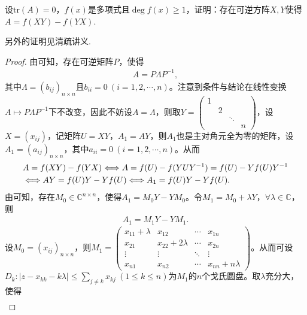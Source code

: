 \documentclass[../../main.tex]{subfiles}%
\begin{document}
\begin{proposition}
设$\mathrm{tr}(A)=0$，$f(x)$是多项式且$\deg f(x)\geqslant  1$，证明：存在可逆方阵$X,Y$使得$A = f(XY)-f(YX)$.
\end{proposition}
\begin{note}
另外的证明见清疏讲义.
\end{note}
\begin{proof}
由可知，存在可逆矩阵$P$，使得
\begin{align*}
A = P\Lambda P^{-1},
\end{align*}
其中$\Lambda = (b_{ij})_{n\times n}$且$b_{ii} = 0\ (i = 1,2,\cdots,n)$。注意到条件与结论在线性变换$A \mapsto P\Lambda P^{-1}$下不改变，因此不妨设$A = \Lambda$，则取$Y = \begin{pmatrix}
1 & & & \\
& 2 & & \\
& & \ddots & \\
& & & n
\end{pmatrix}$，设$X = (x_{ij})$，记矩阵$U = XY$，$A_1 = AY$，则$A_1$也是主对角元全为零的矩阵，设$A_1 = (a_{ij})_{n\times n}$，其中$a_{ii} = 0\ (i = 1,2,\cdots,n)$。从而
\begin{align}
&A = f(XY) - f(YX) \Longleftrightarrow A = f(U) - f(YUY^{-1}) = f(U) - Yf(U)Y^{-1} \notag \\
&\Longleftrightarrow AY = f(U)Y - Yf(U) \Longleftrightarrow A_1 = f(U)Y - Yf(U). \label{100.49}
\end{align}
由可知，存在$M_0 \in \mathbb{C}^{n\times n}$，使得$A_1 = M_0Y - YM_0$。令$M_1 = M_0 + \lambda Y$，$\forall \lambda \in \mathbb{C}$，则
\begin{align}
A_1 = M_1Y - YM_1. \label{100.48}
\end{align}
设$M_0 = (x_{ij})_{n\times n}$，则$M_1 = \begin{pmatrix}
x_{11} + \lambda & x_{12} & \cdots & x_{1n} \\
x_{21} & x_{22} + 2\lambda & \cdots & x_{2n} \\
\vdots & \vdots & \ddots & \vdots \\
x_{n1} & x_{n2} & \cdots & x_{nn} + n\lambda
\end{pmatrix}$。从而可设$D_k: |z - x_{kk} - k\lambda| \leqslant \sum_{j\ne k} x_{kj}\ (1 \leqslant k \leqslant n)$为$M_1$的$n$个戈氏圆盘。取$\lambda$充分大，使得
\begin{align}

\end{align}
\end{proof}
\end{document}

